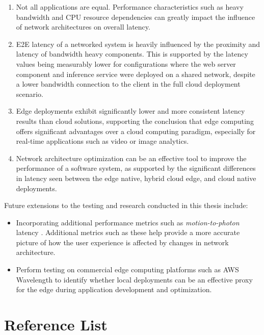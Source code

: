 \documentclass[11pt]{article}
\begin{document}
\begin{enumerate}
    \item {
        Not all applications are equal. Performance characteristics such as heavy bandwidth
        and CPU resource dependencies can greatly impact the influence of network architectures
        on overall latency.
    }
    \item {
        E2E latency of a networked system is heavily influenced by the proximity and latency of 
        bandwidth heavy components. This is supported by the latency values being measurably lower 
        for configurations where the web server component and inference service were deployed on 
        a shared network, despite a lower bandwidth connection to the client in the full cloud 
        deployment scenario.
    }
    \item {
        Edge deployments exhibit significantly lower and more consistent latency results than 
        cloud solutions, supporting the conclusion that edge computing offers significant advantages
        over a cloud computing paradigm, especially for real-time applications such as video
        or image analytics.
    }
    \item {
        Network architecture optimization can be an effective tool to improve the performance of
        a software system, as supported by the significant differences in latency seen between
        the edge native, hybrid cloud edge, and cloud native deployments.
    }
\end{enumerate}

Future extensions to the testing and research conducted in this thesis include:
\begin{itemize}
    \item {
        Incorporating additional performance metrics such as \emph{motion-to-photon} latency \cite{9229154}.
        Additional metrics such as these help provide a more accurate picture of how the user
        experience is affected by changes in network architecture.
        } 
    \item {
        Perform testing on commercial edge computing platforms such as AWS Wavelength to identify
        whether local deployments can be an effective proxy for the edge during application 
        development and optimization.
    }
\end{itemize}

\newpage
\section{Reference List}


\end{document}
